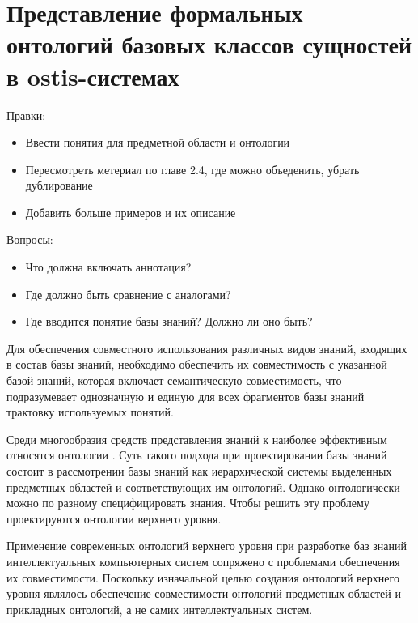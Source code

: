 \chapter{Представление формальных онтологий базовых классов сущностей в ostis-системах}
\label{chapter_top_ontologies}


Правки:
\begin{itemize}
	\item Ввести понятия для предметной области и онтологии
	\item Пересмотреть метериал по главе 2.4, где можно объеденить, убрать дублирование
	\item Добавить больше примеров и их описание
\end{itemize}

Вопросы:
\begin{itemize}
	\item Что должна включать аннотация?
	\item Где должно быть сравнение с аналогами?
	\item Где вводится понятие базы знаний? Должно ли оно быть?
\end{itemize}

Для обеспечения совместного использования различных видов знаний, входящих в состав базы знаний, необходимо обеспечить их совместимость с указанной базой знаний, которая включает семантическую совместимость, что подразумевает однозначную и единую для всех фрагментов базы знаний трактовку используемых понятий.

Среди многообразия средств представления знаний к наиболее эффективным относятся онтологии   
\cite{Davydenko2017}. Суть такого подхода при проектировании базы знаний состоит в рассмотрении базы знаний как иерархической системы выделенных предметных областей и соответствующих им онтологий. Однако онтологически можно по разному специфицировать знания. Чтобы решить эту проблему проектируются онтологии верхнего уровня.

Применение современных онтологий верхнего уровня при разработке баз знаний интеллектуальных компьютерных систем сопряжено с проблемами обеспечения их совместимости. Поскольку изначальной целью создания онтологий верхнего уровня являлось обеспечение  совместимости онтологий предметных областей и прикладных онтологий, а не самих интеллектуальных систем. 

